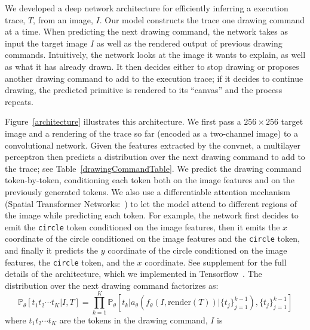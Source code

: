 \documentclass{article}
\newcommand{\probability}{\mathds{P}} %
\newcommand{\remark}[1]{\textcolor{red}{[#1]}}
\begin{document}
We developed a deep network architecture for efficiently inferring a
execution trace, $T$, from an image, $I$.  Our model constructs the
trace one drawing command at a time.  When predicting the next drawing
command, the network takes as input the target image $I$ as well as
the rendered output of previous drawing commands.  Intuitively, the
network looks at the image it wants to explain, as well as what it has
already drawn.  It then decides either to stop drawing or proposes
another drawing command to add to the execution trace; if it decides
to continue drawing, the predicted primitive is rendered to its
``canvas'' and the process repeats.

Figure~\ref{architecture} illustrates this architecture.  We first
pass a $256\times 256$ target image and a rendering of the trace so
far (encoded as a two-channel image) to a convolutional network. Given
the features extracted by the convnet, a multilayer perceptron then
predicts a distribution over the next drawing command to add to the
trace; see Table~\ref{drawingCommandTable}.  We predict the drawing
command token-by-token, conditioning each token both on the image
features and on the previously generated tokens. We also use a
differentiable attention mechanism (Spatial Transformer
Networks:~\cite{jaderberg2015spatial}) to let the model attend to
different regions of the image while predicting each token. For
example, the network first decides to emit the \verb|circle| token
conditioned on the image features, then it emits the $x$ coordinate of
the circle conditioned on the image features and the \verb|circle|
token, and finally it predicts the $y$ coordinate of the circle
conditioned on the image features, the \verb|circle| token, and the
$x$ coordinate.  See supplement for the full details of the
architecture, which we implemented in
Tensorflow~\cite{tensorflow2015-whitepaper}.
The distribution over the next drawing command factorizes as:
\begin{equation}
  \probability_\theta [t_1t_2\cdots t_K | I,T] = \prod_{k = 1}^K \probability_\theta \left[t_k | a_\theta \left(f_\theta(I,\text{render}(T)) | \{t_j\}_{j = 1}^{k - 1}\right), \{t_j\}_{j = 1}^{k - 1}\right]
\end{equation}
where $t_1t_2\cdots t_K$ are the tokens in the drawing command, $I$ is
\end{document}
